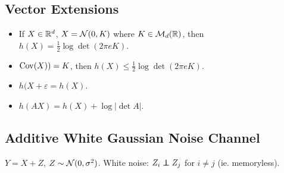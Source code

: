 \subsection{Vector Extensions}
\begin{itemize}
    \item If $X \in \mathbb{R}^d$, $X=\mathcal{N}(0, K)$ where $K \in \mathcal{M}_d(\mathbb{R})$, then $h(X) = \frac{1}{2}\log \det(2\pi e K)$.
    \item $\operatorname{Cov}(X)) = K$, then $h(X) \leqslant \frac{1}{2} \log \det (2\pi e K)$.
    \item $h(X+\varepsilon = h(X)$.
    \item $h(AX) = h(X) + \log \lvert\det A \rvert$.
\end{itemize}

\subsection{Additive White Gaussian Noise Channel}

$Y = X + Z$, $Z\sim \mathcal{N}(0,\sigma^2)$. White noise: $Z_i \perp\hspace{-7pt}\perp Z_j$ for $i\neq j$ (ie. memoryless).




